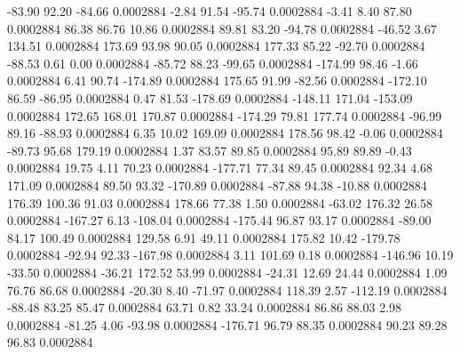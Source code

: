       -83.90       92.20      -84.66     0.0002884
       -2.84       91.54      -95.74     0.0002884
       -3.41        8.40       87.80     0.0002884
       86.38       86.76       10.86     0.0002884
       89.81       83.20      -94.78     0.0002884
      -46.52        3.67      134.51     0.0002884
      173.69       93.98       90.05     0.0002884
      177.33       85.22      -92.70     0.0002884
      -88.53        0.61        0.00     0.0002884
      -85.72       88.23      -99.65     0.0002884
     -174.99       98.46       -1.66     0.0002884
        6.41       90.74     -174.89     0.0002884
      175.65       91.99      -82.56     0.0002884
     -172.10       86.59      -86.95     0.0002884
        0.47       81.53     -178.69     0.0002884
     -148.11      171.04     -153.09     0.0002884
      172.65      168.01      170.87     0.0002884
     -174.29       79.81      177.74     0.0002884
      -96.99       89.16      -88.93     0.0002884
        6.35       10.02      169.09     0.0002884
      178.56       98.42       -0.06     0.0002884
      -89.73       95.68      179.19     0.0002884
        1.37       83.57       89.85     0.0002884
       95.89       89.89       -0.43     0.0002884
       19.75        4.11       70.23     0.0002884
     -177.71       77.34       89.45     0.0002884
       92.34        4.68      171.09     0.0002884
       89.50       93.32     -170.89     0.0002884
      -87.88       94.38      -10.88     0.0002884
      176.39      100.36       91.03     0.0002884
      178.66       77.38        1.50     0.0002884
      -63.02      176.32       26.58     0.0002884
     -167.27        6.13     -108.04     0.0002884
     -175.44       96.87       93.17     0.0002884
      -89.00       84.17      100.49     0.0002884
      129.58        6.91       49.11     0.0002884
      175.82       10.42     -179.78     0.0002884
      -92.94       92.33     -167.98     0.0002884
        3.11      101.69        0.18     0.0002884
     -146.96       10.19      -33.50     0.0002884
      -36.21      172.52       53.99     0.0002884
      -24.31       12.69       24.44     0.0002884
        1.09       76.76       86.68     0.0002884
      -20.30        8.40      -71.97     0.0002884
      118.39        2.57     -112.19     0.0002884
      -88.48       83.25       85.47     0.0002884
       63.71        0.82       33.24     0.0002884
       86.86       88.03        2.98     0.0002884
      -81.25        4.06      -93.98     0.0002884
     -176.71       96.79       88.35     0.0002884
       90.23       89.28       96.83     0.0002884
